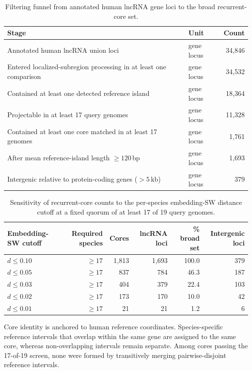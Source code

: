 \begin{table}[t]
  \centering
  \caption{Filtering funnel from annotated human lncRNA gene loci to the broad
  recurrent-core set.}
  \label{tab:core-funnel}
  \begin{tabular}{llr}
    \toprule
    Stage & Unit & Count \\
    \midrule
    Annotated human lncRNA union loci
    & gene locus & 34{,}846 \\
    Entered localized-subregion processing in at least one comparison
    & gene locus & 34{,}532 \\
    Contained at least one detected reference island
    & gene locus & 18{,}364 \\
    Projectable in at least 17 query genomes
    & gene locus & 11{,}328 \\
    Contained at least one core matched in at least 17 genomes
    & gene locus & 1{,}761 \\
    After mean reference-island length $\geq120$\,bp
    & gene locus & 1{,}693 \\
    Intergenic relative to protein-coding genes ($>5$\,kb)
    & gene locus & 379 \\
    \bottomrule
  \end{tabular}
\end{table}

\begin{table}[t]
  \centering
  \caption{Sensitivity of recurrent-core counts to the per-species embedding-SW
  distance cutoff at a fixed quorum of at least 17 of 19 query genomes.}
  \label{tab:core-distance-sensitivity}
  \begin{tabular}{lrrrrr}
    \toprule
    Embedding-SW cutoff & Required species & Cores & lncRNA loci & \% broad set & Intergenic loci \\
    \midrule
    $d\leq0.10$ & $\geq17$ & 1{,}813 & 1{,}693 & 100.0 & 379 \\
    $d\leq0.05$ & $\geq17$ & 837 & 784 & 46.3 & 187 \\
    $d\leq0.03$ & $\geq17$ & 404 & 379 & 22.4 & 103 \\
    $d\leq0.02$ & $\geq17$ & 173 & 170 & 10.0 & 42 \\
    $d\leq0.01$ & $\geq17$ & 21 & 21 & 1.2 & 6 \\
    \bottomrule
  \end{tabular}
\end{table}

Core identity is anchored to human reference coordinates. Species-specific
reference intervals that overlap within the same gene are assigned to the same
core, whereas non-overlapping intervals remain separate. Among cores passing the
17-of-19 screen, none were formed by transitively merging pairwise-disjoint
reference intervals.

